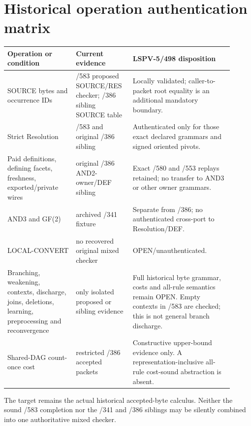\documentclass[11pt]{article}
\begin{document}
\section{Historical operation authentication matrix}
\begin{center}
\begin{tabular}{p{0.29\linewidth}p{0.21\linewidth}p{0.41\linewidth}}
\toprule
Operation or condition & Current evidence & LSPV-5/498 disposition\\
\midrule
SOURCE bytes and occurrence IDs & /583 proposed SOURCE/RES checker; /386 sibling SOURCE table & Locally validated; caller-to-packet root equality is an additional mandatory boundary.\\
Strict Resolution & /583 and original /386 sibling & Authenticated only for those exact declared grammars and signed oriented pivots.\\
Paid definitions, defining facets, freshness, exported/private wires & original /386 AND2-owner/DEF sibling & Exact /580 and /553 replays retained; no transfer to AND3 or other owner grammars.\\
AND3 and GF(2) & archived /341 fixture & Separate from /386; no authenticated cross-port to Resolution/DEF.\\
LOCAL-CONVERT & no recovered original mixed checker & OPEN/unauthenticated.\\
Branching, weakening, contexts, discharge, joins, deletions, learning, preprocessing and reconvergence & only isolated proposed or sibling evidence & Full historical byte grammar, costs and all-rule semantics remain OPEN.  Empty contexts in /583 are checked; this is not general branch discharge.\\
Shared-DAG count-once cost & restricted /386 accepted packets & Constructive upper-bound evidence only.  A representation-inclusive all-rule cost-sound abstraction is absent.\\
\bottomrule
\end{tabular}
\end{center}

The target remains the actual historical accepted-byte calculus.  Neither the
sound /583 completion nor the /341 and /386 siblings may be silently combined
into one authoritative mixed checker.
\end{document}
